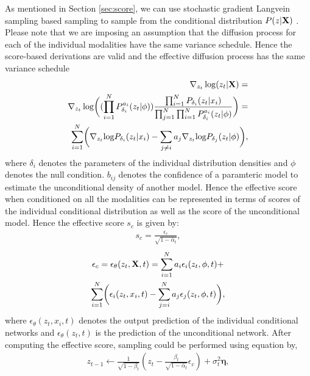 \documentclass[10pt,twocolumn,letterpaper]{article}
\begin{document}
  As mentioned in Section \ref{sec:score}, we can use stochastic gradient Langvein sampling based sampling to sample from the conditional distribution $P(z|{\bf{X}})$ . Please note that we are imposing an assumption that the diffusion process for each of the individual modalities have the same variance schedule. Hence the score-based derivations are valid and the effective diffusion process has the same variance schedule
 \begin{equation}
\begin{split}
 \nabla_{z_t}\log  (z_t|{\bf{X}}) =   \\
\nabla_{z_t}\log  \biggl((\prod_{i=1}^{N}P_{\delta_i}^{a_i}(z_t|\phi))\frac{\prod_{i=1}^{N}P_{\delta_i}(z_t|x_i)}{\prod_{j=1}^{N}\prod_{i=1}^{N}P_{\delta_i}^{a_i}(z_t|\phi)} \biggr)=\\
     \sum_{i=1}^N \biggl( \nabla_{z_t}\text{log} P_{\delta_i}(z_t|x_i) - \sum_{j\neq i}a_j \nabla_{z_t}\text{log}  P_{\delta_j}(z_t|\phi)\biggr),
\end{split}
\end{equation}
where $\delta_i$ denotes the parameters of the individual distribution densities and $\phi$ denotes the null condition.  $b_{ij}$ denotes the confidence of a  paramteric model to estimate the unconditional density of another model. Hence the effective score when conditioned on all the modalities can be represented in terms of scores of the individual conditional distribution as well as the score of the unconditional model. Hence the effective score $s_{c}$ is given by:
\begin{align}
    s_{c} = \frac{\epsilon_c}{\sqrt{1-\bar{\alpha}_t}},
\end{align}
\begin{multline}
   \epsilon_{c}= \epsilon_{\theta}(z_t,{\bf{X}} ,t) =\sum_{i=1}^N a_i \epsilon_{i}(z_t,\phi,t) +\\
   \sum_{i=1}^N\biggl( \epsilon_{i}(z_t,x_i,t)-
   \sum_{j=i}^N a_{j}\epsilon_j (z_t,\phi,t)\biggr),
   \label{eq:multimodal1}
\end{multline}
where $\epsilon_{\theta}(z_t,x_i,t)$ denotes the output prediction of the individual conditional networks and $\epsilon_{\theta}(z_t,t)$ is the prediction of the unconditional network. After computing the effective score, sampling could be performed using equation by,
\begin{multline}
    z_{t-1} \leftarrow{} \frac{1}{\sqrt{1-\beta_t}} \left( z_t - \frac{ \beta_t}{\sqrt{1-\bar{\alpha}_t}}\epsilon_c \right) + \sigma_t^2 \boldsymbol{\eta},
\end{multline}
\end{document}
